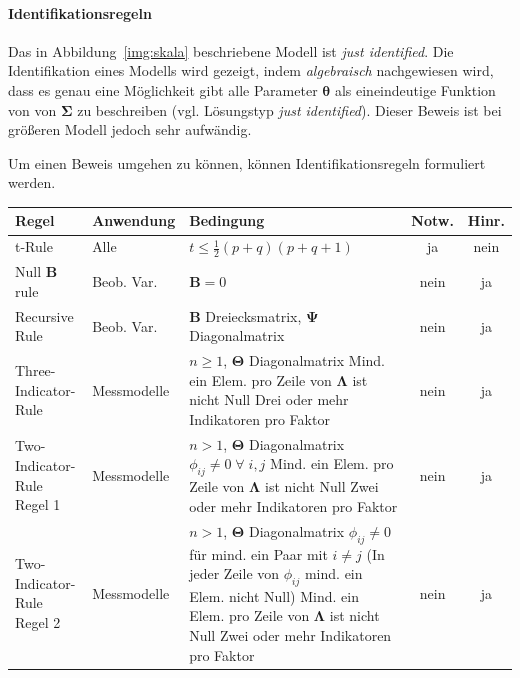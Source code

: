 \documentclass{article}
\numberwithin{equation}{section}
\begin{document}
\paragraph*{Identifikationsregeln}

Das in Abbildung~\ref{img:skala} beschriebene Modell ist \emph{just identified}. Die Identifikation eines Modells wird gezeigt, indem \emph{algebraisch} nachgewiesen wird, dass es genau eine Möglichkeit gibt alle Parameter $\boldsymbol\theta$ als eineindeutige Funktion von von $\boldsymbol\Sigma$ zu beschreiben (vgl. Lösungstyp \emph{just identified}). Dieser Beweis ist bei größeren Modell jedoch sehr aufwändig.

Um einen Beweis umgehen zu können, können Identifikationsregeln formuliert werden.

\begin{tabular}{lllcc}
\textbf{Regel} & \textbf{Anwendung} & \textbf{Bedingung} & \textbf{Notw.} & \textbf{Hinr.}\\
\hline
t-Rule & Alle & $t \le \frac{1}{2}(p+q)(p+q+1)$ & ja & nein\\
Null $\mathbf{B}$ rule & Beob. Var. & $\mathbf{B} = 0$ & nein & ja\\
Recursive Rule & Beob. Var. & $\mathbf{B}$ Dreiecksmatrix, $\boldsymbol \Psi$ Diagonalmatrix \vspace*{0.3cm} & nein & ja\\
Three-Indicator-Rule & Messmodelle & \pbox{7.5cm}{$n \ge 1$, $\boldsymbol \Theta$ Diagonalmatrix\\ Mind. ein Elem. pro Zeile von $\boldsymbol \Lambda$ ist nicht Null\\ Drei oder mehr Indikatoren pro Faktor}\vspace*{0.3cm} & nein & ja\\
\pbox{4cm}{Two-Indicator-Rule\\ Regel 1} & Messmodelle & \pbox{7.5cm}{$n > 1$, $\boldsymbol \Theta$ Diagonalmatrix\\ $\phi_{ij} \neq 0 \;\forall\; i,j$\\ Mind. ein Elem. pro Zeile von $\boldsymbol \Lambda$ ist nicht Null\\ Zwei oder mehr Indikatoren pro Faktor}\vspace*{0.3cm} & nein & ja\\
\pbox{4cm}{Two-Indicator-Rule\\ Regel 2} & Messmodelle & \pbox{7.5cm}{$n > 1$, $\boldsymbol \Theta$ Diagonalmatrix\\ $\phi_{ij} \neq 0$ für mind. ein Paar mit $i \neq j$\\ (In jeder Zeile von $\phi_{ij}$ mind. ein Elem. nicht Null)\\ Mind. ein Elem. pro Zeile von $\boldsymbol \Lambda$ ist nicht Null\\ Zwei oder mehr Indikatoren pro Faktor}\vspace*{0.3cm} & nein & ja\\

\end{tabular}
\end{document}
